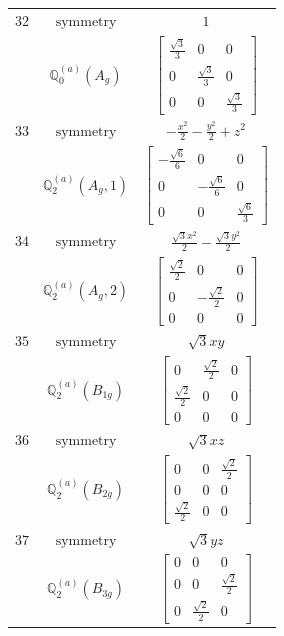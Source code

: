 \documentclass[fleqn,8pt,landscape]{jsarticle}
\begin{document}
\begin{longtable}{ccc}
$ 32 $ & $ \text{symmetry} $ & $ 1 $ \\
$  $ & $ \mathbb{Q}_{0}^{(a)}(A_{g}) $ & $ \begin{bmatrix} \frac{\sqrt{3}}{3} & 0 & 0 \\ 0 & \frac{\sqrt{3}}{3} & 0 \\ 0 & 0 & \frac{\sqrt{3}}{3} \end{bmatrix} $ \\ \hline
$ 33 $ & $ \text{symmetry} $ & $ - \frac{x^{2}}{2} - \frac{y^{2}}{2} + z^{2} $ \\
$  $ & $ \mathbb{Q}_{2}^{(a)}(A_{g},1) $ & $ \begin{bmatrix} - \frac{\sqrt{6}}{6} & 0 & 0 \\ 0 & - \frac{\sqrt{6}}{6} & 0 \\ 0 & 0 & \frac{\sqrt{6}}{3} \end{bmatrix} $ \\ \hline
$ 34 $ & $ \text{symmetry} $ & $ \frac{\sqrt{3} x^{2}}{2} - \frac{\sqrt{3} y^{2}}{2} $ \\
$  $ & $ \mathbb{Q}_{2}^{(a)}(A_{g},2) $ & $ \begin{bmatrix} \frac{\sqrt{2}}{2} & 0 & 0 \\ 0 & - \frac{\sqrt{2}}{2} & 0 \\ 0 & 0 & 0 \end{bmatrix} $ \\ \hline
$ 35 $ & $ \text{symmetry} $ & $ \sqrt{3} x y $ \\
$  $ & $ \mathbb{Q}_{2}^{(a)}(B_{1g}) $ & $ \begin{bmatrix} 0 & \frac{\sqrt{2}}{2} & 0 \\ \frac{\sqrt{2}}{2} & 0 & 0 \\ 0 & 0 & 0 \end{bmatrix} $ \\ \hline
$ 36 $ & $ \text{symmetry} $ & $ \sqrt{3} x z $ \\
$  $ & $ \mathbb{Q}_{2}^{(a)}(B_{2g}) $ & $ \begin{bmatrix} 0 & 0 & \frac{\sqrt{2}}{2} \\ 0 & 0 & 0 \\ \frac{\sqrt{2}}{2} & 0 & 0 \end{bmatrix} $ \\ \hline
$ 37 $ & $ \text{symmetry} $ & $ \sqrt{3} y z $ \\
$  $ & $ \mathbb{Q}_{2}^{(a)}(B_{3g}) $ & $ \begin{bmatrix} 0 & 0 & 0 \\ 0 & 0 & \frac{\sqrt{2}}{2} \\ 0 & \frac{\sqrt{2}}{2} & 0 \end{bmatrix} $ \\ \hline

\end{longtable}
\end{document}
